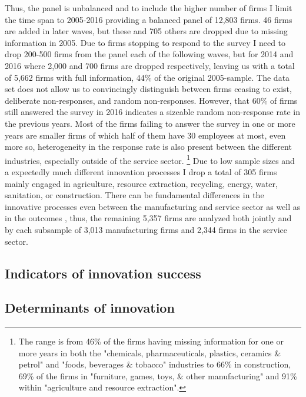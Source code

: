Thus, the panel is unbalanced and to include the higher number of firms I limit the time span to 2005-2016 providing a balanced panel of 12,803 firms. 46 firms are added in later waves, but these and 705 others are dropped due to missing information in 2005. Due to firms stopping to respond to the survey I need to drop 200-500 firms from the panel each of the following waves, but for 2014 and 2016 where 2,000 and 700 firms are dropped respectively, leaving us with a total of 5,662 firms with full information, 44\% of the original 2005-sample. The data set does not allow us to  convincingly distinguish between firms ceasing to exist, deliberate non-responses, and random non-responses. However, that 60\% of firms still answered the survey in 2016 indicates a sizeable random non-response rate in the previous years. Most of the firms failing to answer the survey in one or more years are smaller firms of which half of them have 30 employees at most, even more so, heterogeneity in the response rate is also present between the different industries, especially outside of the service sector.
\footnote{The range is from 46\% of the firms having missing information for one or more years in both the "chemicals, pharmaceuticals, plastics, ceramics \& petrol" and "foods, beverages \& tobacco" industries to 66\% in construction, 69\% of the firms in "furniture, games, toys, \& other manufacturing" and 91\% within "agriculture and resource extraction".}
Due to low sample sizes and a expectedly much different innovation processes I drop a total of 305 firms mainly engaged in agriculture, resource extraction, recycling, energy, water, sanitation, or construction. There can be fundamental differences in the innovative processes even between the manufacturing and service sector \citep{hoffman1998small} as well as in the outcomes \citep{harrison2014does}, thus, the remaining 5,357 firms are analyzed both jointly and by each subsample of 3,013 manufacturing firms and 2,344 firms in the service sector.


\subsection{Indicators of innovation success}
\label{subsec:proxies}


\subsection{Determinants of innovation}
\label{subsec:determinants}
